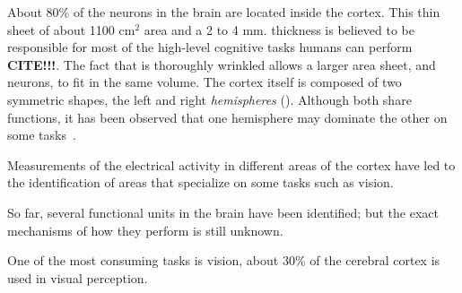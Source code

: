 About 80\% of the neurons in the brain are located inside the cortex. This thin sheet of about 1100 cm$^2$ area and a 2 to 4 mm. thickness is believed to be responsible for most of the high-level cognitive tasks humans can perform \textbf{CITE!!!}. The fact that is thoroughly wrinkled allows a larger area sheet, and neurons, to fit in the same volume. 
The cortex itself is composed of two symmetric shapes, the left and right \emph{hemispheres} (). Although both share functions, it has been observed that one hemisphere may dominate the other on some tasks~\cite{lateralization}. 



Measurements of the electrical activity in different areas of the cortex have led to the identification of areas that specialize on some tasks such as vision. 

So far, several functional units in the brain have been identified; but the exact mechanisms of how they perform is still unknown.


One of the most consuming tasks is vision, about 30\% of the cerebral cortex is used in visual perception. 

